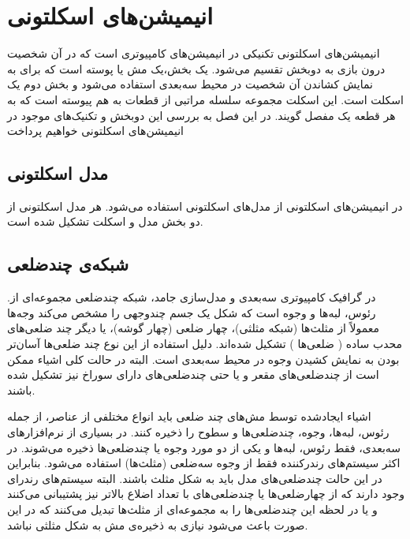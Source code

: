 \chapter { انیمیشن‌های اسکلتونی }


انیمیشن‌های اسکلتونی تکنیکی در انیمیشن‌های کامپیوتری است که در آن شخصیت درون بازی به دوبخش تقسیم ‌می‌شود. یک بخش،یک مش یا پوسته است که برای به نمایش کشاندن ‌آن شخصیت در محیط سه‌بعدی استفاده می‌شود و بخش دوم یک اسکلت است. این اسکلت مجموعه سلسله مراتبی از قطعات به‌ هم پیوسته است که به هر قطعه یک مفصل گویند.
در این فصل به بررسی این دوبخش و تکنیک‌های موجود در انیمیشن‌های اسکلتونی خواهیم پرداخت

\section{مدل اسکلتونی}

در انیمیشن‌های اسکلتونی از مدل‌های اسکلتونی استفاده می‌شود. هر مدل اسکلتونی از دو بخش مدل و اسکلت تشکیل شده است. 

\section{شبکه‌ی\protect{} چندضلعی}

.در گرافیک کامپیوتری سه‌بعدی و مدل‌سازی جامد، شبکه چند‌ضلعی مجموعه‌ای از رئوس، لبه‌ها و وجوه است که شکل یک جسم چند‌وجهی را مشخص می‌کند
وجه‌ها معمولاً از مثلث‌ها (شبکه مثلثی)، چهار ضلعی (چهار گوشه)، یا دیگر چند ضلعی‌های محدب ساده
(
	ضلعی‌ها
)
تشکیل شده‌اند. دلیل استفاده از این نوع چند ضلعی‌ها آسان‌تر بودن به نمایش کشیدن وجوه در محیط سه‌بعدی است.
البته در حالت کلی اشیاء ممکن است از چندضلعی‌های مقعر و یا حتی چندضلعی‌های دارای سوراخ نیز تشکیل شده باشند.

اشیاء ایجادشده توسط مش‌های چند ضلعی باید انواع مختلفی از عناصر، از جمله رئوس، لبه‌ها، وجوه، چندضلعی‌ها و سطوح را ذخیره کنند.
در بسیاری از نرم‌افزارهای سه‌بعدی، فقط رئوس، لبه‌ها و یکی از دو مورد وجوه یا چند‌ضلعی‌ها ذخیره می‌شوند.
در اکثر سیستم‌های رندرکننده
فقط از وجوه سه‌ضلعی
(مثلث‌ها)
استفاده‌ می‌شود.
بنابراین در این حالت چند‌ضلعی‌های مدل باید به شکل مثلث باشند. البته سیستم‌های رندرای وجود دارند که از چهارضلعی‌ها یا چندضلعی‌های با تعداد اضلاع بالاتر نیز پشتیبانی ‌می‌کنند و یا در لحظه این چندضلعی‌ها را به مجموعه‌ای از مثلث‌ها تبدیل می‌کنند که در این صورت باعث ‌می‌شود نیازی به ذخیره‌ی مش به شکل مثلثی نباشد.

